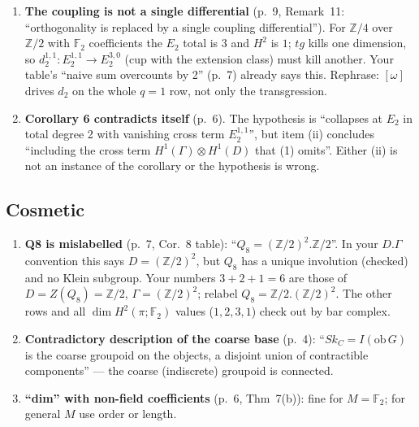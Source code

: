 \documentclass[11pt]{article}
\newcommand{\Z}{\mathbb{Z}}
\newcommand{\F}{\mathbb{F}}
\begin{document}
\begin{enumerate}[label=F\arabic*.,leftmargin=*]
\item \textbf{The coupling is not a single differential} (p.~9, Remark~11:
``orthogonality is replaced by a single coupling differential''). For $\Z/4$ over
$\Z/2$ with $\F_2$ coefficients the $E_2$ total is $3$ and $H^2$ is $1$; $tg$ kills
one dimension, so $d_2^{1,1}:E_2^{1,1}\to E_2^{3,0}$ (cup with the extension class)
must kill another. Your table's ``naive sum overcounts by 2'' (p.~7) already says
this. Rephrase: $[\omega]$ drives $d_2$ on the whole $q=1$ row, not only the
transgression.

\item \textbf{Corollary 6 contradicts itself} (p.~6). The hypothesis is ``collapses at
$E_2$ in total degree 2 with vanishing cross term $E_2^{1,1}$'', but item (ii)
concludes ``including the cross term $H^1(\Gamma)\otimes H^1(D)$ that (1) omits''.
Either (ii) is not an instance of the corollary or the hypothesis is wrong.
\end{enumerate}

\subsection*{Cosmetic}
\begin{enumerate}[label=C\arabic*.,leftmargin=*]
\item \textbf{Q8 is mislabelled} (p.~7, Cor.~8 table): ``$Q_8=(\Z/2)^2.\Z/2$''. In
your $D.\Gamma$ convention this says $D=(\Z/2)^2$, but $Q_8$ has a unique involution
(checked) and no Klein subgroup. Your numbers $3+2+1=6$ are those of
$D=Z(Q_8)=\Z/2$, $\Gamma=(\Z/2)^2$; relabel $Q_8=\Z/2.(\Z/2)^2$. The other rows and
all $\dim H^2(\pi;\F_2)$ values ($1,2,3,1$) check out by bar complex.
\item \textbf{Contradictory description of the coarse base} (p.~4): ``$Sk_{C}=I(\mathrm{ob}\,G)$
is the coarse groupoid on the objects, a disjoint union of contractible
components'' --- the coarse (indiscrete) groupoid is connected.
\item \textbf{``dim'' with non-field coefficients} (p.~6, Thm~7(b)): fine for
$M=\F_2$; for general $M$ use order or length.
\end{enumerate}
\end{document}
